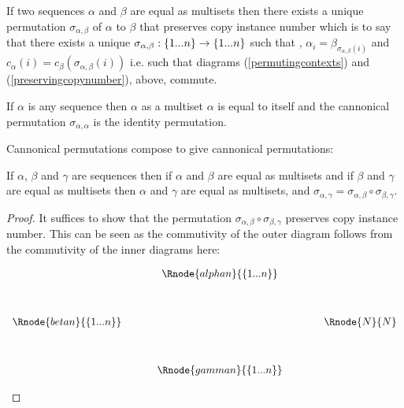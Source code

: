 \documentclass[10pt,a4paper]{scrartcl}
\begin{document}
\begin{observation}
If two sequences $\alpha$ and $\beta$ are equal as multisets then there exists a unique permutation $\sigma_{\alpha,\beta}$ of $\alpha$ to $\beta$ 
that preserves copy instance number which is to say that there exists a unique
 $\sigma_{\alpha,\beta}: \left\{1...n\right\} \rightarrow \left\{1...n\right\}$ 
such that \foreachi, $\alpha_i = \beta_{\sigma_{\alpha,\beta}(i)}$ 
and $c_\alpha(i) = c_\beta(\sigma_{\alpha,\beta}(i))$ i.e. such that
diagrams (\ref{permutingcontexts}) and (\ref{preservingcopynumber}), above, commute.
\end{observation}

\begin{observation}
If $\alpha$ is any sequence then $\alpha$ as a multiset $\alpha$ is equal  to itself and
the cannonical permutation 
$\sigma_{\alpha,\alpha}$ is the identity permutation.
\end{observation}

Cannonical permutations compose to give cannonical permutations:
\begin{lemma}
If  $\alpha$, $\beta$ and $\gamma$ are sequences then if $\alpha$ and $\beta$ are equal as multisets and if $\beta$ and $\gamma$ are equal as multisets then
$\alpha$ and $\gamma$ are equal as multisets, and
$\sigma_{\alpha,\gamma}=\sigma_{\alpha,\beta} \circ \sigma_{\beta,\gamma}$.
\end{lemma}
\begin{proof}
It suffices to show that the permutation $\sigma_{\alpha,\beta} \circ \sigma_{\beta,\gamma}$
preserves copy instance number. This can be seen as the commutivity of the outer diagram
follows from the commutivity of the inner diagrams here:
\begin{center}
\begin{displaymath}
\begin{array}{cp{.5cm}cp{.7cm}c}
                         && \Rnode{alphan}{\set{\n}}   &&              \\ [1.2cm]
\Rnode{betan}{\set{\n}} &&                           && \Rnode{N}{N} \\ [1.2cm]
                         && \Rnode{gamman}{\set{\n}}   &&             
\end{array}
\end{displaymath}
\blabel{\sigma_{\alpha,\beta}}
\blabel{\sigma_{\beta,\gamma}}
\end{center}				
\end{proof}
\end{document}
